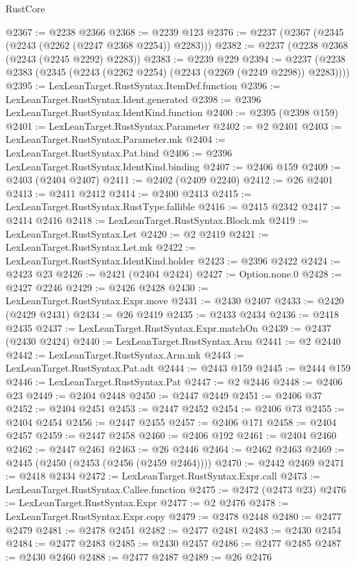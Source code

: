 \begin{lexlean}{RustCore}
\begin{coremodule}
@2367 := @2238 @2366
@2368 := @2239 @123
@2376 := @2237 (@2367 (@2345 (@2243 (@2262 (@2247 @2368 @2254)) @2283)))
@2382 := @2237 (@2238 @2368 (@2243 (@2245 @2292) @2283))
@2383 := @2239 @229
@2394 := @2237 (@2238 @2383 (@2345 (@2243 (@2262 @2254) (@2243 (@2269 (@2249 @2298)) @2283))))
@2395 := LexLeanTarget.RustSyntax.ItemDef.function
@2396 := LexLeanTarget.RustSyntax.Ident.generated
@2398 := @2396 LexLeanTarget.RustSyntax.IdentKind.function
@2400 := @2395 (@2398 @159)
@2401 := LexLeanTarget.RustSyntax.Parameter
@2402 := @2 @2401
@2403 := LexLeanTarget.RustSyntax.Parameter.mk
@2404 := LexLeanTarget.RustSyntax.Pat.bind
@2406 := @2396 LexLeanTarget.RustSyntax.IdentKind.binding
@2407 := @2406 @159
@2409 := @2403 (@2404 @2407)
@2411 := @2402 (@2409 @2240)
@2412 := @26 @2401
@2413 := @2411 @2412
@2414 := @2400 @2413
@2415 := LexLeanTarget.RustSyntax.RustType.fallible
@2416 := @2415 @2342
@2417 := @2414 @2416
@2418 := LexLeanTarget.RustSyntax.Block.mk
@2419 := LexLeanTarget.RustSyntax.Let
@2420 := @2 @2419
@2421 := LexLeanTarget.RustSyntax.Let.mk
@2422 := LexLeanTarget.RustSyntax.IdentKind.holder
@2423 := @2396 @2422
@2424 := @2423 @23
@2426 := @2421 (@2404 @2424)
@2427 := Option.none.{0}
@2428 := @2427 @2246
@2429 := @2426 @2428
@2430 := LexLeanTarget.RustSyntax.Expr.move
@2431 := @2430 @2407
@2433 := @2420 (@2429 @2431)
@2434 := @26 @2419
@2435 := @2433 @2434
@2436 := @2418 @2435
@2437 := LexLeanTarget.RustSyntax.Expr.matchOn
@2439 := @2437 (@2430 @2424)
@2440 := LexLeanTarget.RustSyntax.Arm
@2441 := @2 @2440
@2442 := LexLeanTarget.RustSyntax.Arm.mk
@2443 := LexLeanTarget.RustSyntax.Pat.adt
@2444 := @2443 @159
@2445 := @2444 @159
@2446 := LexLeanTarget.RustSyntax.Pat
@2447 := @2 @2446
@2448 := @2406 @23
@2449 := @2404 @2448
@2450 := @2447 @2449
@2451 := @2406 @37
@2452 := @2404 @2451
@2453 := @2447 @2452
@2454 := @2406 @73
@2455 := @2404 @2454
@2456 := @2447 @2455
@2457 := @2406 @171
@2458 := @2404 @2457
@2459 := @2447 @2458
@2460 := @2406 @192
@2461 := @2404 @2460
@2462 := @2447 @2461
@2463 := @26 @2446
@2464 := @2462 @2463
@2469 := @2445 (@2450 (@2453 (@2456 (@2459 @2464))))
@2470 := @2442 @2469
@2471 := @2418 @2434
@2472 := LexLeanTarget.RustSyntax.Expr.call
@2473 := LexLeanTarget.RustSyntax.Callee.function
@2475 := @2472 (@2473 @23)
@2476 := LexLeanTarget.RustSyntax.Expr
@2477 := @2 @2476
@2478 := LexLeanTarget.RustSyntax.Expr.copy
@2479 := @2478 @2448
@2480 := @2477 @2479
@2481 := @2478 @2451
@2482 := @2477 @2481
@2483 := @2430 @2454
@2484 := @2477 @2483
@2485 := @2430 @2457
@2486 := @2477 @2485
@2487 := @2430 @2460
@2488 := @2477 @2487
@2489 := @26 @2476

\end{coremodule}
\end{lexlean}
